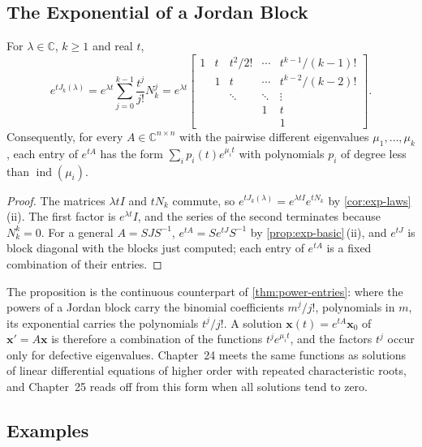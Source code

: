\subsection{The Exponential of a Jordan Block}

\begin{proposition}
\label{prop:exp-jordan}
For $\lambda\in\mathbb C$, $k\ge1$ and real $t$,
\[
e^{tJ_k(\lambda)}=e^{\lambda t}\sum_{j=0}^{k-1}\frac{t^j}{j!}N_k^j=e^{\lambda t}\begin{bmatrix}1&t&t^2/2!&\cdots&t^{k-1}/(k-1)!\\&1&t&\cdots&t^{k-2}/(k-2)!\\&&\ddots&\ddots&\vdots\\&&&1&t\\&&&&1\end{bmatrix}.
\]
Consequently, for every $A\in\mathbb C^{n\times n}$ with the pairwise different eigenvalues $\mu_1,\ldots,\mu_k$, each entry of $e^{tA}$ has the form $\sum_ip_i(t)e^{\mu_it}$ with polynomials $p_i$ of degree less than $\operatorname{ind}(\mu_i)$.
\end{proposition}

\begin{proof}
The matrices $\lambda tI$ and $tN_k$ commute, so $e^{tJ_k(\lambda)}=e^{\lambda tI}e^{tN_k}$ by \cref{cor:exp-laws}\,(ii). The first factor is $e^{\lambda t}I$, and the series of the second terminates because $N_k^k=0$. For a general $A=SJS^{-1}$, $e^{tA}=Se^{tJ}S^{-1}$ by \cref{prop:exp-basic}\,(ii), and $e^{tJ}$ is block diagonal with the blocks just computed; each entry of $e^{tA}$ is a fixed combination of their entries.
\end{proof}

The proposition is the continuous counterpart of \cref{thm:power-entries}: where the powers of a Jordan block carry the binomial coefficients $m^{\underline j}/j!$, polynomials in $m$, its exponential carries the polynomials $t^j/j!$. A solution $\mathbf x(t)=e^{tA}\mathbf x_0$ of $\mathbf x'=A\mathbf x$ is therefore a combination of the functions $t^je^{\mu_it}$, and the factors $t^j$ occur only for defective eigenvalues. Chapter~24 meets the same functions as solutions of linear differential equations of higher order with repeated characteristic roots, and Chapter~25 reads off from this form when all solutions tend to zero.

\subsection{Examples}

